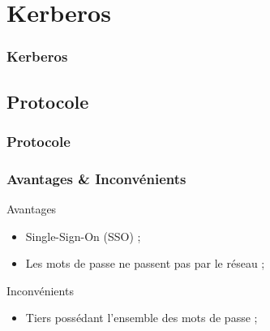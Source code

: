 \documentclass[svgnames]{beamer}
\begin{document}
\begin{frame}



\end{frame}

\section{Kerberos}

\begin{frame}
  \frametitle{Kerberos}
\end{frame}

\subsection{Protocole}

\begin{frame}
 \frametitle{Protocole}
 
\end{frame}

\begin{frame}
 \frametitle{Avantages \& Inconvénients}
 
 \begin{exampleblock}{Avantages}
  \begin{itemize}
   \item Single-Sign-On (SSO) ;
   \item Les mots de passe ne passent pas par le réseau ;
  \end{itemize}
 \end{exampleblock}
 
 \pause
 
 \begin{alertblock}{Inconvénients}
  \begin{itemize}
   \item Tiers possédant l'ensemble des mots de passe ;
  \end{itemize}
 \end{alertblock}
\end{frame}
\end{document}
